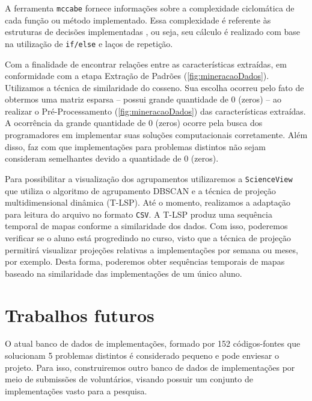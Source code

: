 %	
	
	A ferramenta \texttt{mccabe} \cite{mccabe2013} fornece informações sobre a
	complexidade ciclomática \cite{mccabe} de cada função ou método implementado.
	Essa complexidade é referente às estruturas de decisões implementadas \cite{mccabe},
	ou seja, seu cálculo é realizado com base na utilização de \texttt{if/else} e laços
	de repetição.
	
	Com a finalidade de encontrar relações entre as características extraídas, em
	conformidade com a etapa Extração de Padrões (\cref{fig:mineracaoDados}).
	Utilizamos a técnica de similaridade do cosseno. Sua escolha ocorreu pelo fato de obtermos
	uma matriz esparsa -- possui grande quantidade de 0 (zeros) -- ao realizar o
	Pré-Processamento (\cref{fig:mineracaoDados}) das características extraídas. A
	ocorrência da grande quantidade de 0 (zeros) ocorre pela busca dos programadores
	em implementar suas soluções computacionais corretamente. Além disso, faz com que
	implementações para problemas distintos não sejam consideram semelhantes devido a
	quantidade de 0 (zeros).
	
	Para possibilitar a visualização dos agrupamentos utilizaremos a \texttt{ScienceView}
	\cite{Alencar-etal:2012} que utiliza o algoritmo de agrupamento DBSCAN \cite{Ester1996}
	e a técnica de projeção multidimensional dinâmica 
	(T-LSP). Até o momento, realizamos a adaptação para leitura do arquivo no formato
	\texttt{CSV}. A T-LSP produz uma sequência temporal de mapas conforme a similaridade
	dos dados. Com isso, poderemos verificar se o aluno está progredindo no curso, visto
	que a técnica de projeção permitirá visualizar projeções relativas a implementações
	por semana ou meses, por exemplo. Desta forma, poderemos obter sequências temporais
	de mapas baseado na similaridade das implementações de um único aluno.
	
	\section{Trabalhos futuros}
	
		O atual banco de dados de implementações, formado por 152 códigos-fontes que
		solucionam 5 problemas distintos é considerado pequeno e pode enviesar o
		projeto. Para isso, construiremos outro banco de dados de implementações
		por meio de submissões de voluntários, visando possuir um conjunto de
		implementações vasto para a pesquisa.